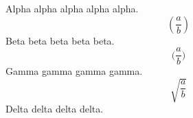 \documentclass[12pt]{article}
\begin{document}
Alpha alpha alpha alpha alpha.
\[ \left( \frac{a}{b} \right) \]
Beta beta beta beta beta.
\[ \Biggl( \frac{a}{b} \Biggr) \]
Gamma gamma gamma gamma.
\[ \sqrt{\frac{a}{b}} \]
Delta delta delta delta.
\end{document}
